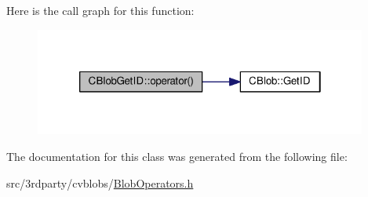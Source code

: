 Here is the call graph for this function\-:\nopagebreak
\begin{figure}[H]
\begin{center}
\leavevmode
\includegraphics[width=310pt]{classCBlobGetID_a01557f50837f1e52f3b6c690c0af6592_cgraph}
\end{center}
\end{figure}




The documentation for this class was generated from the following file\-:\begin{DoxyCompactItemize}
\item 
src/3rdparty/cvblobs/\hyperlink{BlobOperators_8h}{Blob\-Operators.\-h}\end{DoxyCompactItemize}
